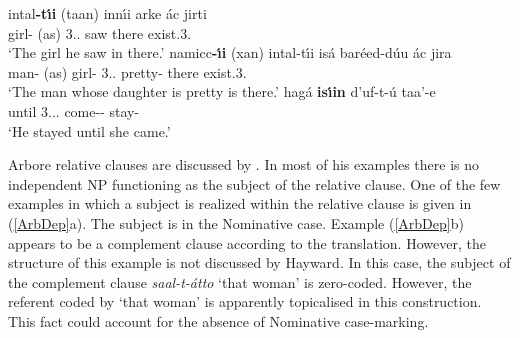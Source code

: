 \begin{exe} \ex\label{HarRel}
\begin{xlist}
\ex\gll intal\textbf{-t\'\i i} (taan) inn\'\i i arke \'ac jirti\\
girl-\nom{} (as) 3\sg{}.\mas{}.\nom{} saw there exist.3\sg{}.\fem{}\\
\glt`The girl he saw in there.'
\ex\gll namicc\textbf{-\'\i i} (xan) intal-t\'\i i is\'a bar\'eed-d\'uu \'ac jira\\
man-\nom{} (as) girl-\nom{} 3\sg{}.\mas{}.\acc{} pretty-\fem{} there exist.3\sg{}.\mas{}\\
\glt `The man whose daughter is pretty is there.'
\ex\gll hag\'a \textbf{is\'\i in} d'uf-t-\'u taa'-e\\
until 3.\sg{}.\fem{}.\nom{} come-\fem{}-\dep{} stay-\pst{}\\
\glt `He stayed until she came.'
\end{xlist}
\end{exe} 

Arbore relative clauses are discussed by \citet[314]{Hayward:1984}. 
In most of his examples there is no independent NP functioning as the subject of the relative clause. 
One of the few examples in which a subject is realized within the relative clause is given in (\ref{ArbDep}a). 
The subject is in the Nominative  case. 
Example (\ref{ArbDep}b) appears to be a complement clause according to the translation. 
However, the structure of this example is not discussed by Hayward. 
In this case, the subject of the complement clause \emph{saal-t-\'atto} `that woman' is zero-coded. 
However, the referent coded by `that woman' is apparently topicalised in this construction. 
This fact could account for the absence of Nominative case-marking.

